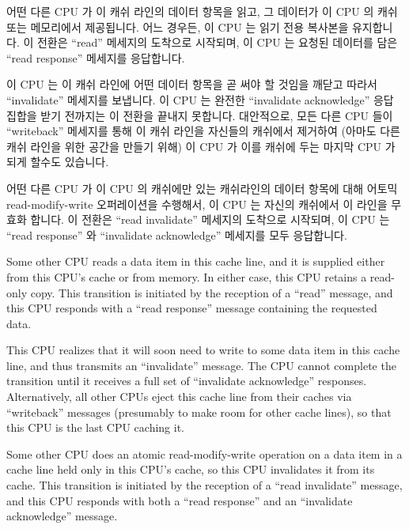 \begin{description}[style=nextline]
\item	[Transition (g):]
	어떤 다른 CPU 가 이 캐쉬 라인의 데이터 항목을 읽고, 그 데이터가 이 CPU
	의 캐쉬 또는 메모리에서 제공됩니다.
	어느 경우든, 이 CPU 는 읽기 전용 복사본을 유지합니다.
	이 전환은 ``read'' 메세지의 도착으로 시작되며, 이 CPU 는 요청된
	데이터를 담은 ``read response'' 메세지를 응답합니다.
\item	[Transition (h):]
	이 CPU 는 이 캐쉬 라인에 어떤 데이터 항목을 곧 써야 할 것임을 깨닫고
	따라서 ``invalidate'' 메세지를 보냅니다.
	이 CPU 는 완전한 ``invalidate acknowledge'' 응답 집합을 받기 전까지는
	이 전환을 끝내지 못합니다.
	대안적으로, 모든 다른 CPU 들이 ``writeback'' 메세지를 통해 이 캐쉬
	라인을 자신들의 캐쉬에서 제거하여 (아마도 다른 캐쉬 라인을 위한 공간을
	만들기 위해) 이 CPU 가 이를 캐쉬에 두는 마지막 CPU 가 되게 할수도
	있습니다.
\item	[Transition (i):]
	어떤 다른 CPU 가 이 CPU 의 캐쉬에만 있는 캐쉬라인의 데이터 항목에 대해
	어토믹 read-modify-write 오퍼레이션을 수행해서, 이 CPU 는 자신의
	캐쉬에서 이 라인을 무효화 합니다.
	이 전환은 ``read invalidate'' 메세지의 도착으로 시작되며, 이 CPU 는
	``read response'' 와 ``invalidate acknowledge'' 메세지를 모두
	응답합니다.

\iffalse

\item	[Transition (g):]
	Some other CPU reads a data item in this cache line,
	and it is supplied either from this CPU's cache or from memory.
	In either case, this CPU retains a read-only copy.
	This transition is initiated by the reception of a ``read''
	message, and this CPU responds with a ``read response'' message
	containing the requested data.
\item	[Transition (h):]
	This CPU realizes that it will soon need to write to some data
	item in this cache line, and thus transmits an ``invalidate'' message.
	The CPU cannot complete the transition until it receives a full
	set of ``invalidate acknowledge'' responses.
	Alternatively, all other CPUs eject this cache line from
	their caches via ``writeback'' messages (presumably to make room
	for other cache lines),
	so that this CPU is the last CPU caching it.
\item	[Transition (i):]
	Some other CPU does an atomic read-modify-write operation on
	a data item in a cache line held only in this CPU's cache,
	so this CPU invalidates it from its cache.
	This transition is initiated by the reception of a ``read invalidate''
	message, and this CPU responds with both a ``read response''
	and an ``invalidate acknowledge'' message.


\end{description}
